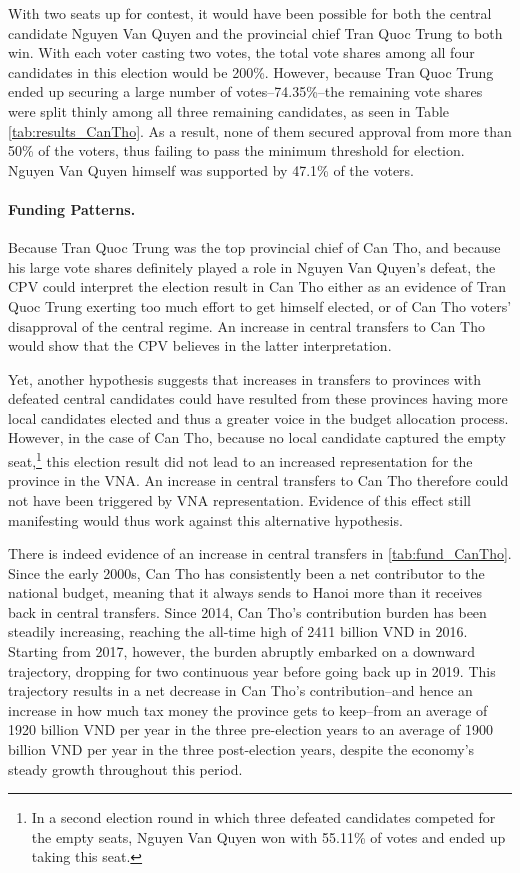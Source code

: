 \documentclass[12pt]{article}
\newcommand\fnote[1]{\footnote{\baselineskip=2\normalbaselineskip#1}}
\newcommand{\1}{\mathbbm{1}}
\begin{document}
With two seats up for contest, it would have been possible for both the central candidate Nguyen Van Quyen and the provincial chief Tran Quoc Trung to both win. With each voter casting two votes, the total vote shares among all four candidates in this election would be 200\%. However, because Tran Quoc Trung ended up securing a large number of votes--74.35\%--the remaining vote shares were split thinly among all three remaining candidates, as seen in Table \ref{tab:results_CanTho}. As a result, none of them secured approval from more than 50\% of the voters, thus failing to pass the minimum threshold for election. Nguyen Van Quyen himself was supported by 47.1\% of the voters.

\paragraph{Funding Patterns.} 

Because Tran Quoc Trung was the top provincial chief of Can Tho, and because his large vote shares definitely played a role in Nguyen Van Quyen's defeat, the CPV could interpret the election result in Can Tho either as an evidence of Tran Quoc Trung exerting too much effort to get himself elected, or of Can Tho voters' disapproval of the central regime. An increase in central transfers to Can Tho would show that the CPV believes in the latter interpretation. 

Yet, another hypothesis suggests that increases in transfers to provinces with defeated central candidates could have resulted from these provinces having more local candidates elected and thus a greater voice in the budget allocation process. However, in the case of Can Tho, because no local candidate captured the empty seat,\fnote{In a second election round in which three defeated candidates competed for the empty seats, Nguyen Van Quyen won with 55.11\% of votes and ended up taking this seat.} this election result did not lead to an increased representation for the province in the VNA. An increase in central transfers to Can Tho therefore could not have been triggered by VNA representation. Evidence of this effect still manifesting would thus work against this alternative hypothesis.

There is indeed evidence of an increase in central transfers in \autoref{tab:fund_CanTho}. Since the early 2000s, Can Tho has consistently been a net contributor to the national budget, meaning that it always sends to Hanoi more than it receives back in central transfers. Since 2014, Can Tho's contribution burden has been steadily increasing, reaching the all-time high of 2411 billion VND in 2016. Starting from 2017, however, the burden abruptly embarked on a downward trajectory, dropping for two continuous year before going back up in 2019. This trajectory results in a net decrease in Can Tho's contribution--and hence an increase in how much tax money the province gets to keep--from an average of 1920 billion VND per year in the three pre-election years to an average of 1900 billion VND per year in the three post-election years, despite the economy's steady growth throughout this period.
\end{document}
